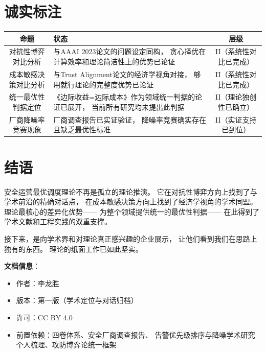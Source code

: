 \documentclass[11pt,a4paper]{article}
\begin{document}
\section{诚实标注}

\begin{center}
\begin{xltabular}{\textwidth}{c|X|c}
\toprule
\textbf{命题} & \textbf{状态} & \textbf{层级} \\
\midrule
对抗性博弈对比分析 &
与AAAI 2023论文的问题设定同构，
贪心择优在计算效率和理论简洁性上的优势已论证 &
II（系统性对比已完成） \\
成本敏感决策对比分析 &
与Trust Alignment论文的经济学视角对接，
够用就行理论的完整度优势已论证 &
II（系统性对比已完成） \\
统一最优性判据定位 &
《边际收益=边际成本》作为领域统一判据的论证已展开，
当前所有研究均未提出此判据 &
II（理论独创性已确立） \\
厂商降噪率竞赛现象 &
厂商调查报告已实证验证，
降噪率竞赛确实存在且缺乏最优性标准 &
II（实证支持已到位） \\
\bottomrule
\end{xltabular}
\end{center}

\section{结语}

安全运营最优调度理论不再是孤立的理论推演。
它在对抗性博弈方向上找到了与学术前沿的精确对话点，
在成本敏感决策方向上找到了经济学视角的学术同盟。
理论最核心的差异化优势——
为整个领域提供统一的最优性判据——
在此得到了学术文献和工程实践的双重支撑。

接下来，是向学术界和对理论真正感兴趣的企业展示，
让他们看到我们在思路上独有的东西。
理论的纸面工作已如此坚实。

\vspace{5mm}
\noindent\textbf{文档信息}：
\begin{itemize}
    \item 作者：李龙胜
    \item 版本：第一版（学术定位与对话归档）
    \item 许可：CC BY 4.0
    \item 前置依赖：四卷体系、安全厂商调查报告、
          告警优先级排序与降噪学术研究个人梳理、攻防博弈论统一框架
\end{itemize}
\end{document}
